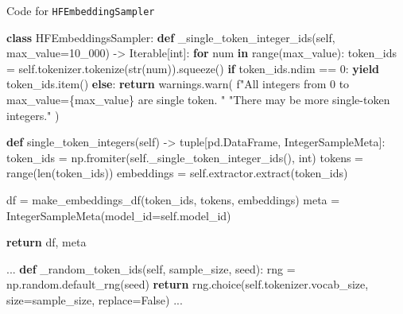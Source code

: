 \documentclass[
  a4paper, twoside, 10pt, titlepage]{book}
\newenvironment{Shaded}{}{}
\newcommand{\BuiltInTok}[1]{\textcolor[rgb]{0.00,0.50,0.00}{#1}}
\newcommand{\ControlFlowTok}[1]{\textcolor[rgb]{0.00,0.44,0.13}{\textbf{#1}}}
\newcommand{\DecValTok}[1]{\textcolor[rgb]{0.25,0.63,0.44}{#1}}
\newcommand{\KeywordTok}[1]{\textcolor[rgb]{0.00,0.44,0.13}{\textbf{#1}}}
\newcommand{\NormalTok}[1]{#1}
\newcommand{\OperatorTok}[1]{\textcolor[rgb]{0.40,0.40,0.40}{#1}}
\newcommand{\SpecialCharTok}[1]{\textcolor[rgb]{0.25,0.44,0.63}{#1}}
\newcommand{\SpecialStringTok}[1]{\textcolor[rgb]{0.73,0.40,0.53}{#1}}
\newcommand{\StringTok}[1]{\textcolor[rgb]{0.25,0.44,0.63}{#1}}
\newcommand{\VariableTok}[1]{\textcolor[rgb]{0.10,0.09,0.49}{#1}}
\begin{document}
\begin{codelisting}

\caption{Code for \texttt{HFEmbeddingSampler}}\label{lst:sampler}

\begin{Shaded}
\begin{Highlighting}[]
\KeywordTok{class}\NormalTok{ HFEmbeddingsSampler:}
    \KeywordTok{def}\NormalTok{ \_single\_token\_integer\_ids(}\VariableTok{self}\NormalTok{, max\_value}\OperatorTok{=}\DecValTok{10\_000}\NormalTok{) }\OperatorTok{{-}\textgreater{}}\NormalTok{ Iterable[}\BuiltInTok{int}\NormalTok{]:}
        \ControlFlowTok{for}\NormalTok{ num }\KeywordTok{in} \BuiltInTok{range}\NormalTok{(max\_value):}
\NormalTok{            token\_ids }\OperatorTok{=} \VariableTok{self}\NormalTok{.tokenizer.tokenize(}\BuiltInTok{str}\NormalTok{(num)).squeeze()}
            \ControlFlowTok{if}\NormalTok{ token\_ids.ndim }\OperatorTok{==} \DecValTok{0}\NormalTok{:}
                \ControlFlowTok{yield}\NormalTok{ token\_ids.item()}
            \ControlFlowTok{else}\NormalTok{:}
                \ControlFlowTok{return}
\NormalTok{        warnings.warn(}
            \SpecialStringTok{f"All integers from 0 to max\_value=}\SpecialCharTok{\{}\NormalTok{max\_value}\SpecialCharTok{\}}\SpecialStringTok{ are single token. "}
            \StringTok{"There may be more single{-}token integers."}
\NormalTok{        )}

    \KeywordTok{def}\NormalTok{ single\_token\_integers(}\VariableTok{self}\NormalTok{) }\OperatorTok{{-}\textgreater{}} \BuiltInTok{tuple}\NormalTok{[pd.DataFrame, IntegerSampleMeta]:}
\NormalTok{        token\_ids }\OperatorTok{=}\NormalTok{ np.fromiter(}\VariableTok{self}\NormalTok{.\_single\_token\_integer\_ids(), }\BuiltInTok{int}\NormalTok{)}
\NormalTok{        tokens }\OperatorTok{=} \BuiltInTok{range}\NormalTok{(}\BuiltInTok{len}\NormalTok{(token\_ids))}
\NormalTok{        embeddings }\OperatorTok{=} \VariableTok{self}\NormalTok{.extractor.extract(token\_ids)}

\NormalTok{        df }\OperatorTok{=}\NormalTok{ make\_embeddings\_df(token\_ids, tokens, embeddings)}
\NormalTok{        meta }\OperatorTok{=}\NormalTok{ IntegerSampleMeta(model\_id}\OperatorTok{=}\VariableTok{self}\NormalTok{.model\_id)}

        \ControlFlowTok{return}\NormalTok{ df, meta}

\NormalTok{    ...}
    \KeywordTok{def}\NormalTok{ \_random\_token\_ids(}\VariableTok{self}\NormalTok{, sample\_size, seed):}
\NormalTok{        rng }\OperatorTok{=}\NormalTok{ np.random.default\_rng(seed)}
        \ControlFlowTok{return}\NormalTok{ rng.choice(}\VariableTok{self}\NormalTok{.tokenizer.vocab\_size, size}\OperatorTok{=}\NormalTok{sample\_size, replace}\OperatorTok{=}\VariableTok{False}\NormalTok{)}
\NormalTok{    ...}
\end{Highlighting}
\end{Shaded}

\end{codelisting}
\end{document}
